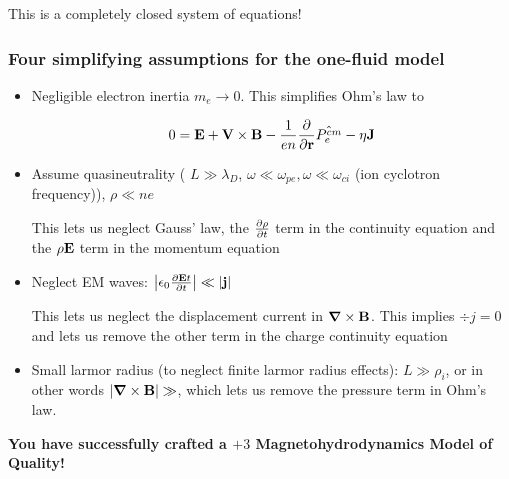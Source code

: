 \documentclass[PlasmaNotes.tex]{subfiles}
\begin{document}
This is a completely closed system of equations! 

\subsubsection{Four simplifying assumptions for the one-fluid model}
\begin{itemize}
\item Negligible electron inertia $m_e \rightarrow 0$. This simplifies Ohm's law to

\[ 0 = \mathbf{E} + \mathbf{V} \times \mathbf{B} - \frac{1}{e n} \frac{\partial }{\partial \mathbf{r}} \hat{P_e^{cm}} - \eta \mathbf{J} \]

\item Assume quasineutrality ( $L \gg \lambda_D$, $\omega \ll \omega_{pe}, \omega \ll \omega_{ci}$ (ion cyclotron frequency)), $\rho \ll n e$

This lets us neglect Gauss' law, the $\frac{\partial \rho}{\partial t}$ term in the continuity equation and the $\rho \mathbf{E}$ term in the momentum equation

\item Neglect EM waves: $\left| \epsilon_0 \frac{\partial \mathbf{E}{t}}{\partial t} \right| \ll \left| \mathbf{j} \right|$

This lets us neglect the displacement current in $\mbox{\boldmath$ \nabla $} \times \mathbf{B}$. This implies $\div{j} =0$ and lets us remove the other term in the charge continuity equation

\item Small larmor radius (to neglect finite larmor radius effects): $L \gg \rho_i$, or in other words $\left| \mbox{\boldmath$ \nabla $} \times \mathbf{B} \right| \gg $, which lets us remove the pressure term in Ohm's law.
\end{itemize}

\begin{center}
\textbf{You have successfully crafted a $+3$ Magnetohydrodynamics Model of Quality!}
\end{center}
\end{document}

